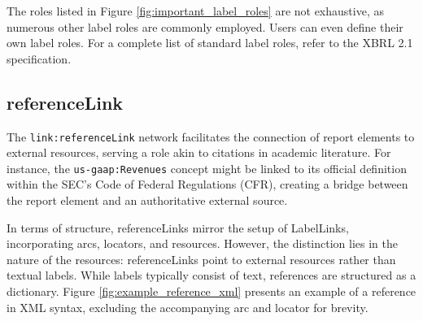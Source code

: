 The roles listed in Figure \ref{fig:important_label_roles} are not exhaustive, as numerous other label roles are commonly employed.
Users can even define their own label roles.
For a complete list of standard label roles, refer to the XBRL 2.1 specification\cite{xbrl21_label_roles}.

\subsection{referenceLink}




The \texttt{link:referenceLink} network facilitates the connection of report elements to external resources, serving a role akin to citations in academic literature.  
For instance, the \texttt{us-gaap:Revenues} concept might be linked to its official definition within the SEC's Code of Federal Regulations (CFR),  
creating a bridge between the report element and an authoritative external source.  

In terms of structure, referenceLinks mirror the setup of LabelLinks, incorporating arcs, locators, and resources.  
However, the distinction lies in the nature of the resources: referenceLinks point to external resources rather than textual labels.  
While labels typically consist of text, references are structured as a dictionary.  
Figure \ref{fig:example_reference_xml} presents an example of a reference in XML syntax, excluding the accompanying arc and locator for brevity.


